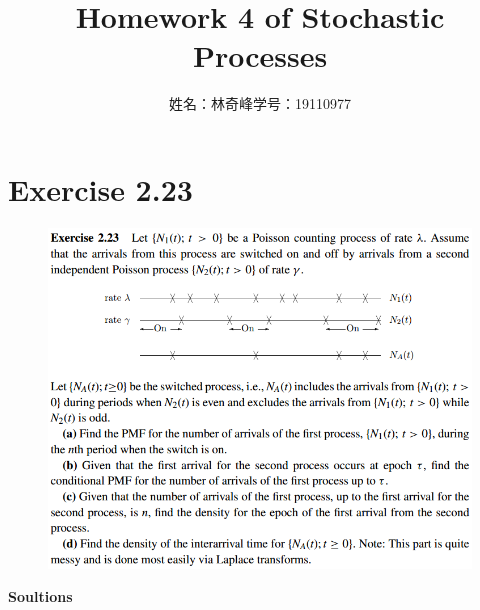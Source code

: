 \documentclass[UTF8]{article}
\begin{document}
\title{Homework 4 of Stochastic Processes}
\author{姓名：林奇峰\qquad 学号：19110977}
\maketitle

\section{Exercise 2.23}
\begin{figure}[h]
    \centering
    \includegraphics[width=5.5in]{exercise__2_23.png}
\end{figure}
\textbf{Soultions}
\end{document}
